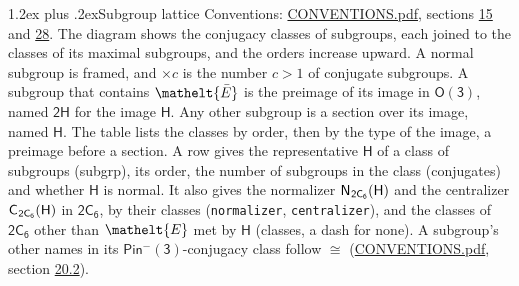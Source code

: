 \documentclass[10pt,a4paper]{article}
\makeatletter
\renewcommand\section{\@startsection{section}{1}{\z@}{-3ex plus -1ex minus -.2ex}%
  {1.2ex plus .2ex}{\normalfont\large\sffamily\bfseries\color{parttitle}}}
\numberwithin{equation}{section}
\newcommand{\eltfont}[1]{{\let\sigma\eltsigma\mathelt{#1}}}
\newcommand{\grp}[1]{\mathsf{#1}}
\newcommand{\cls}[1]{\eltfont{#1}}
\newcommand{\elt}[1]{\eltfont{#1}}
\newcommand{\samecls}{\cong}
\newcommand{\barred}[1]{\bar{#1}}
\newcommand{\hairsp}{\mkern1mu}
\makeatother
\begin{document}
\section{Subgroup lattice}\label{s:subgroups}
Conventions: \href{../../CONVENTIONS.pdf}{CONVENTIONS.pdf}, sections \href{../../../rotation/CONVENTIONS.pdf\#conv.15}{15} and \href{../../CONVENTIONS.pdf\#conv.28}{28}.
The diagram shows the conjugacy classes of subgroups, each joined to the classes of its maximal subgroups, and the orders increase upward. \label{n:index.conjugates.c}A normal subgroup is framed, and ${\times}c$ is the number $c > 1$ of conjugate subgroups. \label{n:group.H}A subgroup that contains $\elt{\barred{E}}$ is the preimage of its image in $\grp{O(3)}$, named $\grp{2H}$ for the image $\grp{H}$. Any other subgroup is a section over its image, named $\grp{H}$. The table lists the classes by order, then by the type of the image, a preimage before a section. \label{n:head.subgroup}\label{n:head.order}\label{n:head.conjugates}\label{n:head.normal}A row gives the representative $\grp{H}$ of a class of subgroups (subgrp), its order, the number of subgroups in the class (conjugates) and whether $\grp{H}$ is normal. \label{n:group.normalizer}\label{n:group.centralizer}\label{n:head.classes}It also gives the normalizer $\grp{N}_{\hairsp \grp{2C_{6}}}(\grp{H})$ and the centralizer $\grp{C}_{\hairsp \grp{2C_{6}}}(\grp{H})$ in $\grp{2C_{6}}$, by their classes (\texttt{normalizer}, \texttt{centralizer}), and the classes of $\grp{2C_{6}}$ other than $\cls{E}$ met by $\grp{H}$ (classes, a dash for none). A subgroup's other names in its \href{Pinminus3.pdf}{$\grp{Pin^{-}(3)}$}-conjugacy class follow $\samecls$ (\href{../../CONVENTIONS.pdf}{CONVENTIONS.pdf}, section \href{../../CONVENTIONS.pdf\#conv.20.2}{20.2}).
\begin{center}
\end{center}
\end{document}
